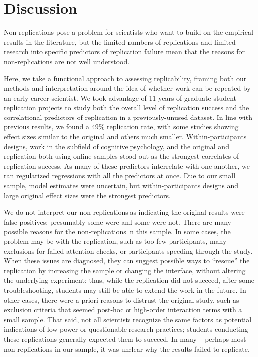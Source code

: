 \documentclass[
  english,
  a4paper,
]{article}
\begin{document}
\hypertarget{discussion}{%
\section{Discussion}\label{discussion}}

Non-replications pose a problem for scientists who want to build on the empirical results in the literature, but the limited numbers of replications and limited research into specific predictors of replication failure mean that the reasons for non-replications are not well understood.

Here, we take a functional approach to assessing replicability, framing both our methods and interpretation around the idea of whether work can be repeated by an early-career scientist. We took advantage of 11 years of graduate student replication projects to study both the overall level of replication success and the correlational predictors of replication in a previously-unused dataset. In line with previous results, we found a 49\% replication rate, with some studies showing effect sizes similar to the original and others much smaller. Within-participants designs, work in the subfield of cognitive psychology, and the original and replication both using online samples stood out as the strongest correlates of replication success. As many of these predictors interrelate with one another, we ran regularized regressions with all the predictors at once. Due to our small sample, model estimates were uncertain, but within-participants designs and large original effect sizes were the strongest predictors.

We do not interpret our non-replications as indicating the original results were false positives: presumably some were and some were not. There are many possible reasons for the non-replications in this sample. In some cases, the problem may be with the replication, such as too few participants, many exclusions for failed attention checks, or participants speeding through the study. When these issues are diagnosed, they can suggest possible ways to ``rescue'' the replication by increasing the sample or changing the interface, without altering the underlying experiment; thus, while the replication did not succeed, after some troubleshooting, students may still be able to extend the work in the future. In other cases, there were a priori reasons to distrust the original study, such as exclusion criteria that seemed post-hoc or high-order interaction terms with a small sample. That said, not all scientists recognize the same factors as potential indications of low power or questionable research practices; students conducting these replications generally expected them to succeed. In many -- perhaps most -- non-replications in our sample, it was unclear why the results failed to replicate.
\end{document}
